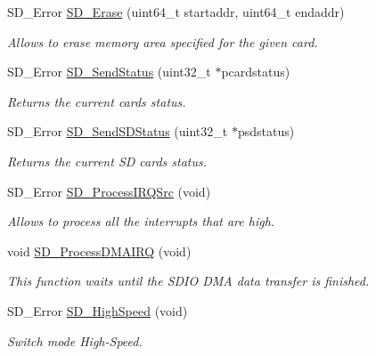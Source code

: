 \begin{DoxyCompactItemize}
S\+D\+\_\+\+Error \hyperlink{group___s_t_m324x_g___e_v_a_l___s_d_i_o___s_d___private___functions_gaca2450c63f52cd6c1d50f6de33ecfdf8}{S\+D\+\_\+\+Erase} (uint64\+\_\+t startaddr, uint64\+\_\+t endaddr)
\begin{DoxyCompactList}\small\item\em Allows to erase memory area specified for the given card. \end{DoxyCompactList}\item 
S\+D\+\_\+\+Error \hyperlink{group___s_t_m324x_g___e_v_a_l___s_d_i_o___s_d___private___functions_ga7de24baeb4c6a7c9e5668630b8797888}{S\+D\+\_\+\+Send\+Status} (uint32\+\_\+t $\ast$pcardstatus)
\begin{DoxyCompactList}\small\item\em Returns the current card\textquotesingle{}s status. \end{DoxyCompactList}\item 
S\+D\+\_\+\+Error \hyperlink{group___s_t_m324x_g___e_v_a_l___s_d_i_o___s_d___private___functions_gab573516bdaa3054877172415e66d0e57}{S\+D\+\_\+\+Send\+S\+D\+Status} (uint32\+\_\+t $\ast$psdstatus)
\begin{DoxyCompactList}\small\item\em Returns the current SD card\textquotesingle{}s status. \end{DoxyCompactList}\item 
S\+D\+\_\+\+Error \hyperlink{group___s_t_m324x_g___e_v_a_l___s_d_i_o___s_d___private___functions_gab21b0412e865d8cabc915dc840fa1ccc}{S\+D\+\_\+\+Process\+I\+R\+Q\+Src} (void)
\begin{DoxyCompactList}\small\item\em Allows to process all the interrupts that are high. \end{DoxyCompactList}\item 
void \hyperlink{group___s_t_m324x_g___e_v_a_l___s_d_i_o___s_d___private___functions_ga52ec18498c19918549142f6680a7b21e}{S\+D\+\_\+\+Process\+D\+M\+A\+I\+RQ} (void)
\begin{DoxyCompactList}\small\item\em This function waits until the S\+D\+IO D\+MA data transfer is finished. \end{DoxyCompactList}\item 
S\+D\+\_\+\+Error \hyperlink{group___s_t_m324x_g___e_v_a_l___s_d_i_o___s_d___private___functions_ga2457c748cf09c7ad5d3c9211d11e3fab}{S\+D\+\_\+\+High\+Speed} (void)
\begin{DoxyCompactList}\small\item\em Switch mode High-\/\+Speed. \end{DoxyCompactList}\end{DoxyCompactItemize}


